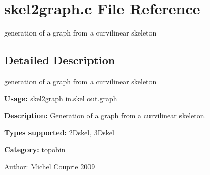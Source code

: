 \section{skel2graph.c File Reference}
\label{skel2graph_8c}
generation of a graph from a curvilinear skeleton 



\subsection{Detailed Description}
generation of a graph from a curvilinear skeleton 

{\bf Usage:} skel2graph in.skel out.graph

{\bf Description:} Generation of a graph from a curvilinear skeleton.

{\bf Types supported:} 2Dskel, 3Dskel

{\bf Category:} topobin

\begin{Desc}
\item[Author:]Michel Couprie 2009 \end{Desc}
